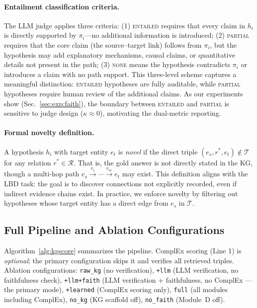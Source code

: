 \paragraph{Entailment classification criteria.}
The LLM judge applies three criteria: (1) \textsc{entailed} requires that every claim in $h_i$ is directly supported by $\pi_i$---no additional information is introduced; (2) \textsc{partial} requires that the core claim (the source--target link) follows from $\pi_i$, but the hypothesis may add explanatory mechanisms, causal claims, or quantitative details not present in the path; (3) \textsc{none} means the hypothesis contradicts $\pi_i$ or introduces a claim with no path support. This three-level scheme captures a meaningful distinction: \textsc{entailed} hypotheses are fully auditable, while \textsc{partial} hypotheses require human review of the additional claims. As our experiments show (Sec.~\ref{sec:exp:faith}), the boundary between \textsc{entailed} and \textsc{partial} is sensitive to judge design ($\kappa{\approx}0$), motivating the dual-metric reporting.

\paragraph{Formal novelty definition.}
A hypothesis $h_i$ with target entity $e_t$ is \emph{novel} if the direct triple $(e_s, r^*, e_t) \notin \mathcal{T}$ for any relation $r^* \in \mathcal{R}$. That is, the gold answer is not directly stated in the KG, though a multi-hop path $e_s \xrightarrow{r_1} \cdots \xrightarrow{r_m} e_t$ may exist. This definition aligns with the LBD task: the goal is to discover connections not explicitly recorded, even if indirect evidence chains exist. In practice, we enforce novelty by filtering out hypotheses whose target entity has a direct edge from $e_s$ in $\mathcal{T}$.

\subsection{Full Pipeline and Ablation Configurations}
Algorithm~\ref{alg:kgscore} summarizes the pipeline. ComplEx scoring (Line 1) is \emph{optional}; the primary configuration skips it and verifies all retrieved triples. Ablation configurations: \texttt{raw\_kg} (no verification), \texttt{+llm} (LLM verification, no faithfulness check), \texttt{+llm+faith} (LLM verification + faithfulness, no ComplEx — the primary mode), \texttt{+learned} (ComplEx scoring only), \texttt{full} (all modules including ComplEx), \texttt{no\_kg} (KG scaffold off), \texttt{no\_faith} (Module~D off).

